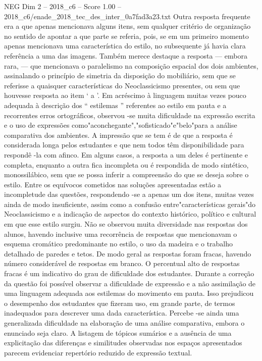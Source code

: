 \begin{textsample}{NEG Dim 2 – 2018\_c6 – Score 1.00 – 2018\_c6/enade\_2018\_tec\_des\_inter\_0a7fad3a23.txt}
Outra resposta frequente era a que apenas mencionava alguns itens, sem qualquer critério de organização no sentido de apontar a que parte se referia, pois, se em um primeiro momento apenas mencionava uma característica do estilo, no subsequente já havia clara referência a uma das imagens.
Também merece destaque a resposta — embora rara, — que mencionava o paralelismo na composição espacial dos dois ambientes, assinalando o princípio de simetria da disposição do mobiliário, sem que se referisse a quaisquer características do Neoclassicismo presentes, ou sem que houvesse resposta ao item ‘ a ’.
Em acréscimo à linguagem muitas vezes pouco adequada à descrição dos “ estilemas ” referentes ao estilo em pauta e a recorrentes erros ortográficos, observou -se muita dificuldade na expressão escrita e o uso de expressões como"aconchegante","sofisticado"e"belo"para a análise comparativa dos ambientes.
A impressão que se tem é de que a resposta é considerada longa pelos estudantes e que nem todos têm disponibilidade para respondê -la com afinco.
Em alguns casos, a resposta a um deles é pertinente e completa, enquanto a outra fica incompleta ou é respondida de modo sintético, monossilábico, sem que se possa inferir a compreensão do que se deseja sobre o estilo.
Entre os equívocos cometidos nas soluções apresentadas estão a incompletude das questões, respondendo -se a apenas um dos itens, muitas vezes ainda de modo insuficiente, assim como a confusão entre"características gerais"do Neoclassicismo e a indicação de aspectos do contexto histórico, político e cultural em que esse estilo surgiu.
Não se observou muita diversidade nas respostas dos alunos, havendo inclusive uma recorrência de respostas que mencionavam o esquema cromático predominante no estilo, o uso da madeira e o trabalho detalhado de paredes e tetos.
De modo geral as respostas foram fracas, havendo número considerável de respostas em branco.
O percentual alto de respostas fracas é um indicativo do grau de dificuldade dos estudantes.
Durante a correção da questão foi possível observar a dificuldade de expressão e a não assimilação de uma linguagem adequada aos estilemas do movimento em pauta.
Isso prejudicou o desempenho dos estudantes que fizeram uso, em grande parte, de termos inadequados para descrever uma dada característica.
Percebe -se ainda uma generalizada dificuldade na elaboração de uma análise comparativa, embora o enunciado seja claro.
A listagem de tópicos sumários e a ausência de uma explicitação das diferenças e similitudes observadas nos espaços apresentados parecem evidenciar repertório reduzido de expressão textual.

\end{textsample}
